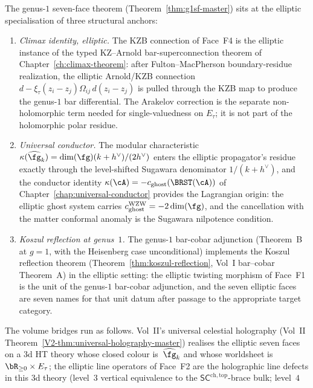 \begin{remark}
\label{rem:g1sf-anchors}
The genus-$1$ seven-face theorem
(Theorem~\ref{thm:g1sf-master}) sits at the elliptic specialisation
of three structural anchors:
\begin{enumerate}[label=\textup{(W\arabic*)}]
\item \emph{Climax identity, elliptic.} The KZB connection of
 Face~F4 is the elliptic instance of the typed KZ--Arnold
 bar-superconnection theorem of Chapter~\ref{ch:climax-theorem}:
after Fulton--MacPherson boundary-residue realization, the elliptic
Arnold/KZB connection
$d-\xi_\tau(z_i-z_j)\Omega_{ij}\,d(z_i-z_j)$ is pulled through the
KZB map to produce the genus-$1$ bar differential. The Arakelov correction is
 the separate non-holomorphic term needed for single-valuedness on
 $E_\tau$; it is not part of the holomorphic polar residue.
\item \emph{Universal conductor.} The modular characteristic
 $\kappa(\widehat{\fg}_k) = \dim(\fg)(k+h^\vee)/(2h^\vee)$ enters
 the elliptic propagator's residue exactly through the level-shifted
 Sugawara denominator $1/(k+h^\vee)$, and the conductor identity
 $\kappa(\cA) = -c_{\mathrm{ghost}}(\BRST(\cA))$ of
 Chapter~\ref{chap:universal-conductor} provides the Lagrangian
 origin: the elliptic ghost system carries
 $c_{\mathrm{ghost}}^{\mathrm{WZW}} = -2\dim(\fg)$, and the
 cancellation with the matter conformal anomaly is the Sugawara
 nilpotence condition.
\item \emph{Koszul reflection at genus~$1$.} The genus-$1$
 bar-cobar adjunction
 (Theorem~B at $g=1$, with the Heisenberg case unconditional)
 implements the Koszul reflection theorem
 (Theorem~\ref{thm:koszul-reflection}, Vol~I bar--cobar Theorem~A)
 in the elliptic setting: the elliptic twisting morphism of
 Face~F1 is the unit of the genus-$1$ bar-cobar adjunction, and
 the seven elliptic faces are seven names for that unit datum
 after passage to the appropriate target category.
\end{enumerate}
The volume bridges run as follows. Vol~II's universal
celestial holography (Vol~II Theorem~\ref{V2-thm:universal-holography-master})
realises the elliptic seven faces on a 3d HT theory whose closed
colour is~$\widehat{\fg}_k$ and whose worldsheet is
$\bR_{\geq 0} \times E_\tau$; the elliptic line operators of Face~F2
are the holographic line defects in this 3d theory (level~$3$ vertical
equivalence to the $\mathsf{SC}^{\mathrm{ch,top}}$-brace bulk; level~$4$

\end{remark}
